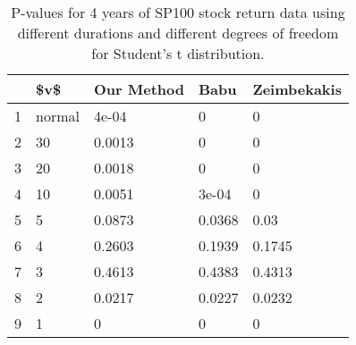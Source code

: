 \begin{table}[ht]
\centering
\caption{P-values for 4 years of SP100 stock return 
                   data using different durations
  and different degrees of freedom for Student's t distribution.} 
\label{table:SP1004}
\begin{tabular}{rllll}
  \hline
 & \$v\$ & Our Method & Babu & Zeimbekakis \\ 
  \hline
1 & normal & 4e-04 & 0 & 0 \\ 
  2 & 30 & 0.0013 & 0 & 0 \\ 
  3 & 20 & 0.0018 & 0 & 0 \\ 
  4 & 10 & 0.0051 & 3e-04 & 0 \\ 
  5 & 5 & 0.0873 & 0.0368 & 0.03 \\ 
  6 & 4 & 0.2603 & 0.1939 & 0.1745 \\ 
  7 & 3 & 0.4613 & 0.4383 & 0.4313 \\ 
  8 & 2 & 0.0217 & 0.0227 & 0.0232 \\ 
  9 & 1 & 0 & 0 & 0 \\ 
   \hline
\end{tabular}
\end{table}

